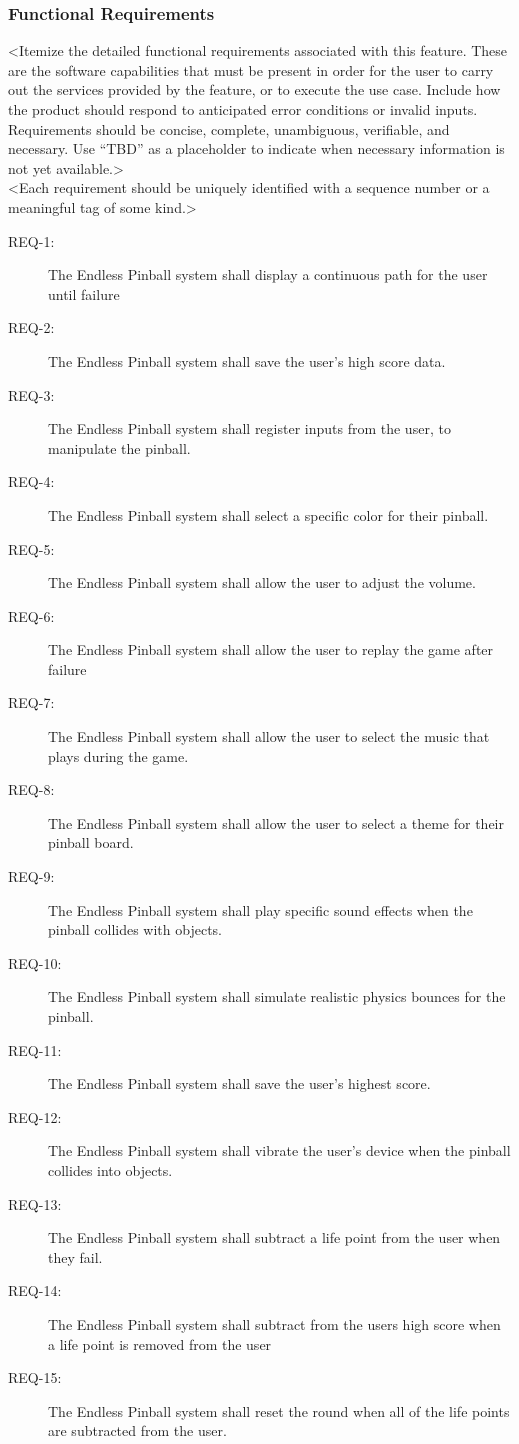 \documentclass[11pt]{article}
\begin{document}
\subsubsection{Functional Requirements}
\label{sec:org3b55e13}
<Itemize the detailed functional requirements associated with this feature. These are the software capabilities that must be present in order for the user to carry out the services provided by the feature, or to execute the use case. Include how the product should respond to anticipated error conditions or invalid inputs. Requirements should be concise, complete, unambiguous, verifiable, and necessary. Use “TBD” as a placeholder to indicate when necessary information is not yet available.>\\
<Each requirement should be uniquely identified with a sequence number or a meaningful tag of some kind.>
\begin{description}
\item[{REQ-1:}] The Endless Pinball system shall display a continuous path for the user until failure
\item[{REQ-2:}] The Endless Pinball system shall save the user’s high score data.
\item[{REQ-3:}] The Endless Pinball system shall register inputs from the user, to manipulate the pinball.
\item[{REQ-4:}] The Endless Pinball system shall select a specific color for their pinball.
\item[{REQ-5:}] The Endless Pinball system shall allow the user to adjust the volume.
\item[{REQ-6:}] The Endless Pinball system shall allow the user to replay the game after failure
\item[{REQ-7:}] The Endless Pinball system shall allow the user to select the music that plays during the game.
\item[{REQ-8:}] The Endless Pinball system shall allow the user to select a theme for their pinball board.
\item[{REQ-9:}] The Endless Pinball system shall play specific sound effects when the pinball collides with objects.
\item[{REQ-10:}] The Endless Pinball system shall simulate realistic physics bounces for the pinball.
\item[{REQ-11:}] The Endless Pinball system shall save the user’s highest score.
\item[{REQ-12:}] The Endless Pinball system shall vibrate the user’s device when the pinball collides into objects.
\item[{REQ-13:}] The Endless Pinball system shall subtract a life point from the user when they fail.
\item[{REQ-14:}] The Endless Pinball system shall subtract from the users high score when a life point is removed from the user
\item[{REQ-15:}] The Endless Pinball system shall reset the round when all of the life points are subtracted from the user.
\end{description}
\end{document}
